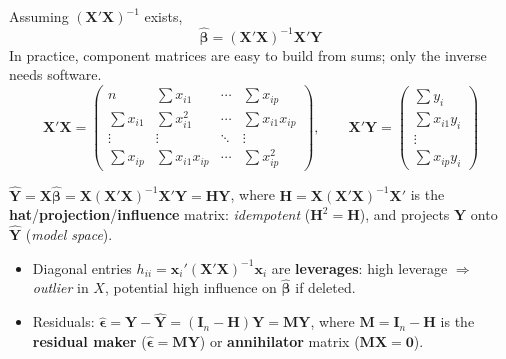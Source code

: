 \begin{proposition}[LS Estimator]\label{prop:betahat}
    Assuming $(\mathbf{X}'\mathbf{X})^{-1}$ exists,
    \[\boxed{\hat{\boldsymbol\beta} = (\mathbf{X}'\mathbf{X})^{-1}\mathbf{X}'\mathbf{Y}}\]
    In practice, component matrices are easy to build from sums; only
    the inverse needs software.
    \[\mathbf{X}'\mathbf{X} = \begin{pmatrix}
    n & \sum x_{i1} & \cdots & \sum x_{ip}\\
    \sum x_{i1} & \sum x_{i1}^2 & \cdots & \sum x_{i1}x_{ip}\\
    \vdots & \vdots & \ddots & \vdots\\
    \sum x_{ip} & \sum x_{i1}x_{ip} & \cdots & \sum x_{ip}^2
    \end{pmatrix}, \qquad
    \mathbf{X}'\mathbf{Y} = \begin{pmatrix}\sum y_i\\\sum x_{i1}y_i\\\vdots\\\sum x_{ip}y_i\end{pmatrix}\]
\end{proposition}

\begin{definition}
    $\hat{\mathbf{Y}}=\mathbf{X}\hat{\boldsymbol\beta}=\mathbf{X}(\mathbf{X}'\mathbf{X})^{-1}\mathbf{X}'\mathbf{Y}=\mathbf{H}\mathbf{Y}$,
    where $\mathbf{H}=\mathbf{X}(\mathbf{X}'\mathbf{X})^{-1}\mathbf{X}'$ is
    the \textbf{hat}/\textbf{projection}/\textbf{influence} matrix:
    \emph{idempotent} ($\mathbf{H}^2=\mathbf{H}$), and projects $\mathbf{Y}$
    onto $\hat{\mathbf{Y}}$ (\emph{model space}).
    \begin{itemize}
        \item Diagonal entries $h_{ii}=\mathbf{x}_i'(\mathbf{X}'\mathbf{X})^{-1}\mathbf{x}_i$
        are \textbf{leverages}: high leverage $\Rightarrow$ \emph{outlier} in
        $X$, potential high influence on $\hat{\boldsymbol\beta}$ if
        deleted.
        \item Residuals: $\hat{\boldsymbol\epsilon}=\mathbf{Y}-\hat{\mathbf{Y}}=(\mathbf{I}_n-\mathbf{H})\mathbf{Y}=\mathbf{M}\mathbf{Y}$,
        where $\mathbf{M}=\mathbf{I}_n-\mathbf{H}$ is the \textbf{residual
        maker} ($\hat{\boldsymbol\epsilon}=\mathbf{M}\mathbf{Y}$) or
        \textbf{annihilator} matrix ($\mathbf{M}\mathbf{X}=\mathbf{0}$).
    \end{itemize}
\end{definition}


